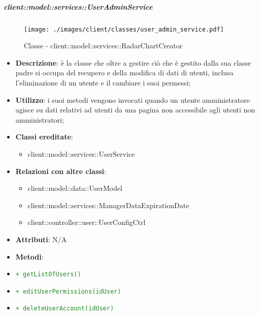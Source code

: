 \begin{itemize}
\begin{itemize}
				\end{itemize}
			\end{itemize}

		\subparagraph{client::model::services::UserAdminService} %
		\label{subp:client_model_services_useradminservice}
		\begin{figure}[htbp]
				\centering
				\centerline{\texttt{[image: ./images/client/classes/user\_admin\_service.pdf]}}
				\caption{Classe - client::model::services::RadarChartCreator}
			\end{figure}
			\begin{itemize}
				\item \textbf{Descrizione}: è la classe che oltre a gestire ciò che è gestito dalla sua classe padre si occupa del recupero e della modifica di dati di utenti, inclusa l'eliminazione di un utente e il cambiare i suoi permessi;
				\item \textbf{Utilizzo}: i suoi metodi vengono invocati quando un utente amministratore agisce su dati relativi ad utenti da una pagina non accessibile agli utenti non amministratori;
				\item \textbf{Classi ereditate}:
					\begin{itemize}
						\item client::model::services::UserService
					\end{itemize}
				\item \textbf{Relazioni con altre classi}:
					\begin{itemize}
						\item client::model::data::UserModel
						\item client::model::services::ManagerDataExpirationDate
						\item client::controller::user::UserConfigCtrl
					\end{itemize}
				\item \textbf{Attributi}: N/A
				\item \textbf{Metodi}:
				\item \textcolor{forestgreen}{\texttt{+ getListOfUsers()}}
					\item \textcolor{forestgreen}{\texttt{+ editUserPermissions(idUser)}}
					\item \textcolor{forestgreen}{\texttt{+ deleteUserAccount(idUser)}}
				\end{itemize}

